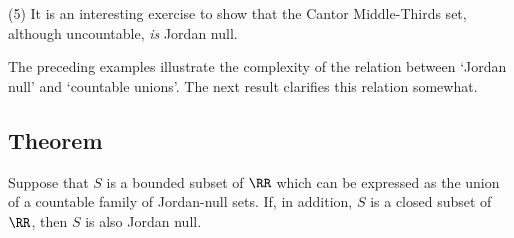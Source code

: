 \V

        (5) It is an interesting exercise to show that the Cantor Middle-Thirds set, although uncountable, {\em is} Jordan null. %
    
\VV

    The preceding examples illustrate the complexity of the relation between `Jordan null' and `countable unions'. The next result clarifies this relation somewhat.

\V

        \subsection{\small{{\bf Theorem}}}
        \label{ThmH20.50A}

\V

        Suppose that $S$ is a bounded subset of ${\RR}$ which can be expressed as the union of a countable family of Jordan-null sets.
    If, in addition, $S$ is a closed subset of ${\RR}$, then $S$ is also Jordan null.

\V

